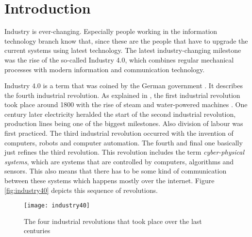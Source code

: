 \chapter{Introduction}
\label{ch:Introduction}




Industry is ever-changing. Especially people working in the information technology branch know that, since these are the people that have to upgrade the current systems using latest technology. The latest industry-changing milestone was the rise of the so-called Industry 4.0, which combines regular mechanical processes with modern information and communication technology.

Industry 4.0 is a term that was coined by the German government \autocite{Industrie4.0Paper}. It describes the fourth industrial revolution. As explained in , the first industrial revolution took place around 1800 with the rise of steam and water-powered machines \autocite{Industrie4.0History}. One century later electricity heralded the start of the second industrial revolution, production lines being one of the biggest milestones. Also division of labour was first practiced. The third industrial revolution occurred with the invention of computers, robots and computer automation. The fourth and final one basically just refines the third revolution. This revolution includes the term \textit{cyber-physical systems}, which are systems that are controlled by computers, algorithms and sensors. This also means that there has to be some kind of communication between these systems which happens mostly over the internet. Figure \vref{fig:industry40} depicts this sequence of revolutions.

\begin{figure}[H]
    \centering
    \texttt{[image: industry40]}
    \caption[The four industrial revolutions that took place over the last centuries]{The four industrial revolutions that took place over the last centuries \autocite{img:industry4.0}}
    \label{fig:industry40}
\end{figure}

